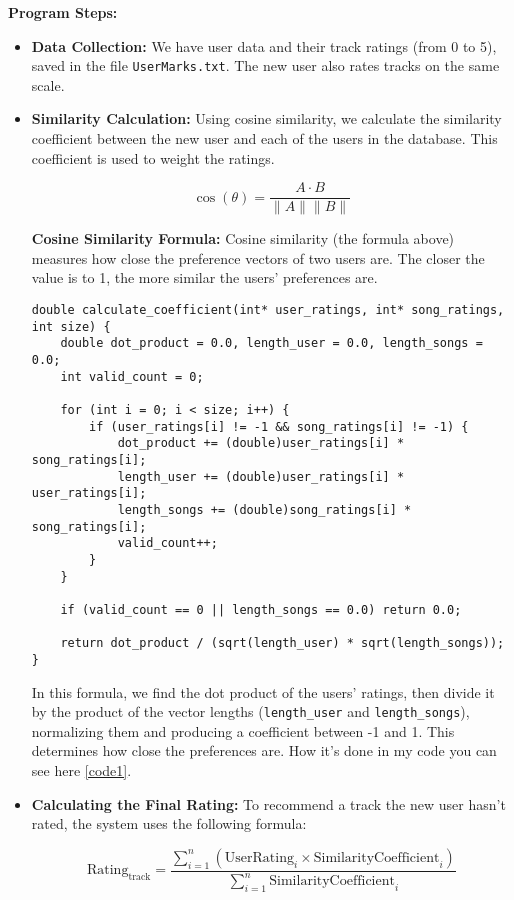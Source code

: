 \documentclass[12pt,a4paper]{article}
\begin{document}
\textbf{Program Steps:}
\begin{itemize}
    \item \textbf{Data Collection:} We have user data and their track ratings (from 0 to 5), saved in the file \texttt{UserMarks.txt}. The new user also rates tracks on the same scale.
    
    \item \textbf{Similarity Calculation:} Using cosine similarity, we calculate the similarity coefficient between the new user and each of the users in the database. This coefficient is used to weight the ratings.

    \[
    \cos(\theta) = \frac{A \cdot B}{\|A\| \|B\|}
    \]

    \textbf{Cosine Similarity Formula:} Cosine similarity (the formula above) measures how close the preference vectors of two users are. The closer the value is to 1, the more similar the users’ preferences are.


\begin{lstlisting}[label={code1}]
double calculate_coefficient(int* user_ratings, int* song_ratings, int size) {
    double dot_product = 0.0, length_user = 0.0, length_songs = 0.0;
    int valid_count = 0;

    for (int i = 0; i < size; i++) {
        if (user_ratings[i] != -1 && song_ratings[i] != -1) {
            dot_product += (double)user_ratings[i] * song_ratings[i];
            length_user += (double)user_ratings[i] * user_ratings[i];
            length_songs += (double)song_ratings[i] * song_ratings[i];
            valid_count++;
        }
    }

    if (valid_count == 0 || length_songs == 0.0) return 0.0;

    return dot_product / (sqrt(length_user) * sqrt(length_songs));
}
\end{lstlisting}



    In this formula, we find the dot product of the users' ratings, then divide it by the product of the vector lengths (\texttt{length\_user} and \texttt{length\_songs}), normalizing them and producing a coefficient between -1 and 1. This determines how close the preferences are. How it's done in my code you can see here \autoref{code1}.

    \item \textbf{Calculating the Final Rating:} To recommend a track the new user hasn’t rated, the system uses the following formula:

    \[
    \text{Rating}_{\text{track}} = \frac{\sum_{i=1}^n (\text{UserRating}_i \times \text{SimilarityCoefficient}_i)}{\sum_{i=1}^n \text{SimilarityCoefficient}_i}
    \]


\end{itemize}
\end{document}
